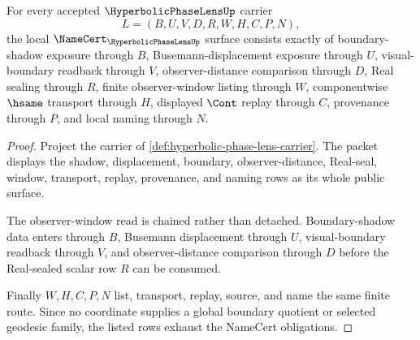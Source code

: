 \begin{theorem}
\label{thm:hyperbolic-phase-lens-namecert-obligations}
For every accepted $\HyperbolicPhaseLensUp$ carrier
$$
L=(B,U,V,D,R,W,H,C,P,N),
$$
the local $\NameCert_{\HyperbolicPhaseLensUp}$ surface consists exactly of boundary-shadow exposure through $B$, Busemann-displacement exposure through $U$, visual-boundary readback through $V$, observer-distance comparison through $D$, Real sealing through $R$, finite observer-window listing through $W$, componentwise $\hsame$ transport through $H$, displayed $\Cont$ replay through $C$, provenance through $P$, and local naming through $N$.
\end{theorem}
\begin{proof}
Project the carrier of \autoref{def:hyperbolic-phase-lens-carrier}. The packet displays the shadow, displacement, boundary, observer-distance, Real-seal, window, transport, replay, provenance, and naming rows as its whole public surface.

The observer-window read is chained rather than detached. Boundary-shadow data enters through $B$, Busemann displacement through $U$, visual-boundary readback through $V$, and observer-distance comparison through $D$ before the Real-sealed scalar row $R$ can be consumed.

Finally $W,H,C,P,N$ list, transport, replay, source, and name the same finite route. Since no coordinate supplies a global boundary quotient or selected geodesic family, the listed rows exhaust the NameCert obligations.
\end{proof}

